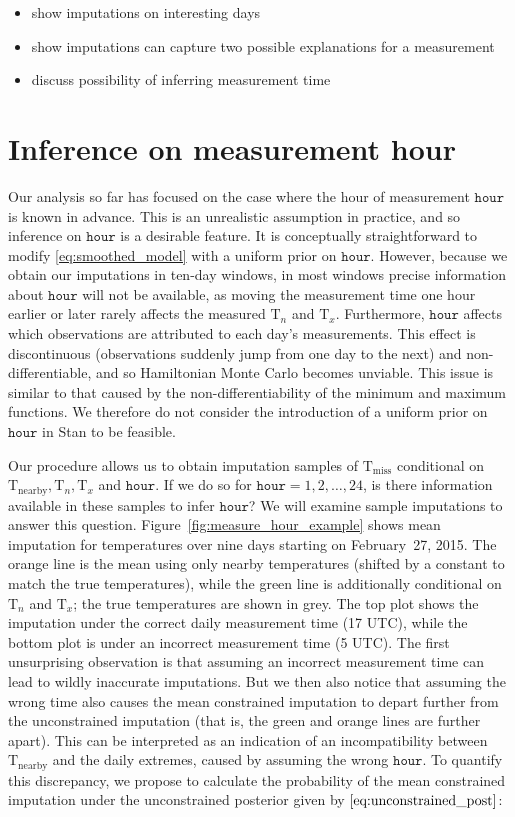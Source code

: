\documentclass[letter]{article}
\providecommand{\tightlist}{%
      \setlength{\itemsep}{0pt}\setlength{\parskip}{0pt}}
\newcommand{\T}{\mathrm{T}}
\newcommand{\Tn}{\T_{n}}
\newcommand{\Tx}{\T_{x}}
\newcommand{\miss}{\mathrm{miss}}
\newcommand{\obs}{\mathrm{nearby}}
\newcommand{\hour}{\mathtt{hour}}
\providecommand{\tightlist}{%
  	  \setlength{\itemsep}{0pt}\setlength{\parskip}{0pt}}
\begin{document}
\begin{itemize}
\tightlist
\item
  show imputations on interesting days
\item
  show imputations can capture two possible explanations for a measurement
\item
  discuss possibility of inferring measurement time
\end{itemize}
    


        \section{Inference on measurement hour}\label{inference-on-measurement-hour}

Our analysis so far has focused on the case where the hour of measurement \(\hour\) is known in advance.
This is an unrealistic assumption in practice, and so inference on \(\hour\) is a desirable feature.
It is conceptually straightforward to modify \eqref{eq:smoothed_model} with a uniform prior on \(\hour\).
However, because we obtain our imputations in ten-day windows, in most windows precise information about \(\hour\) will not be available, as moving the measurement time one hour earlier or later rarely affects the measured \(\Tn\) and \(\Tx\).
Furthermore, \(\hour\) affects which observations are attributed to each day's measurements.
This effect is discontinuous (observations suddenly jump from one day to the next) and non-differentiable, and so Hamiltonian Monte Carlo becomes unviable.
This issue is similar to that caused by the non-differentiability of the minimum and maximum functions.
We therefore do not consider the introduction of a uniform prior on \(\hour\) in Stan to be feasible.

Our procedure allows us to obtain imputation samples of \(\T_\miss\) conditional on \(\T_\obs,\Tn,\Tx\) and \(\hour\).
If we do so for \(\hour=1,2,\ldots,24\), is there information available in these samples to infer \(\hour\)?
We will examine sample imputations to answer this question.
Figure~\ref{fig:measure_hour_example} shows mean imputation for temperatures over nine days starting on February~27, 2015. The orange line is the mean using only nearby temperatures (shifted by a constant to match the true temperatures), while the green line is additionally conditional on \(\Tn\) and \(\Tx\); the true temperatures are shown in grey.
The top plot shows the imputation under the correct daily measurement time (17 UTC), while the bottom plot is under an incorrect measurement time (5 UTC).
The first unsurprising observation is that assuming an incorrect measurement time can lead to wildly inaccurate imputations.
But we then also notice that assuming the wrong time also causes the mean constrained imputation to depart further from the unconstrained imputation
(that is, the green and orange lines are further apart).
This can be interpreted as an indication of an incompatibility between \(\T_\obs\) and the daily extremes, caused by assuming the wrong \(\hour\).
To quantify this discrepancy, we propose to calculate the probability of the mean constrained imputation under the unconstrained posterior given by \(\eqref{eq:unconstrained_post}\):
\end{document}

